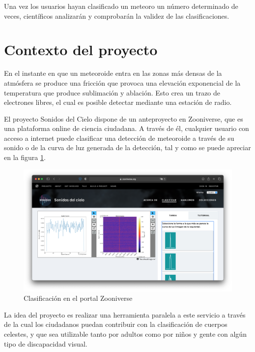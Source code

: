 Una vez los usuarios hayan clasificado un meteoro un número determinado de veces, científicos analizarán y comprobarán la validez de las clasificaciones.
\vspace*{1cm}

\section{Contexto del proyecto}

En el instante en que un meteoroide entra en las zonas más densas de la atmósfera se produce una fricción que provoca una elevación exponencial de la temperatura que produce sublimación y ablación. 
Esto crea un trazo de electrones libres, el cual es posible detectar mediante una estación de radio.

El proyecto Sonidos del Cielo dispone de un anteproyecto en Zooniverse, que es una plataforma online de ciencia ciudadana. A través de él, cualquier usuario con acceso a internet puede clasificar una detección de meteoroide a través de su sonido o de la curva de luz generada de la detección, tal y como se puede apreciar en la figura \ref{fig:web_zooniverse}.

\begin{figure} [h]
    \centering
    \includegraphics[width=\textwidth]{include/figuras/Zooniverse.png}
    \caption{Clasificación en el portal Zooniverse}
    \label{fig:web_zooniverse}
\end{figure}

La idea del proyecto es realizar una herramienta paralela a este servicio a través de la cual los ciudadanos puedan contribuir con la clasificación de cuerpos celestes, y que sea utilizable tanto por adultos como por niños y gente con algún tipo de discapacidad visual.

